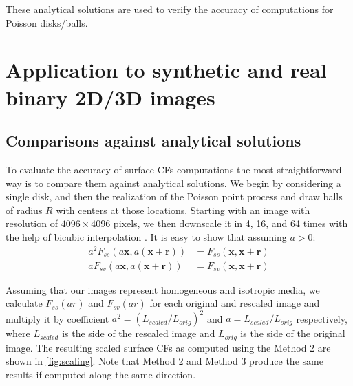 \documentclass[reprint,amsmath,amssymb,aps,pre]{revtex4-1}
\begin{document}
These analytical solutions are used to verify the accuracy of computations for
Poisson disks/balls.

\section{Application to synthetic and real binary 2D/3D images}
\label{sec:results}
\subsection{Comparisons against analytical solutions}
\label{sec:comparison}
To evaluate the accuracy of surface CFs computations the most straightforward
way is to compare them against analytical solutions. We begin by considering a
single disk, and then the realization of the Poisson point process and draw
balls of radius $R$ with centers at those locations. Starting with an image
with resolution of $4096 \times 4096$ pixels, we then downscale it in 4, 16, and
64 times with the help of bicubic interpolation \cite{mexicans}. It is easy to
show that assuming $a > 0$:
\begin{align}
  a^2 F_{ss}(a \mathbf{x}, a(\mathbf{x} + \mathbf{r})) &= F_{ss}(\mathbf{x},
  \mathbf{x} + \mathbf{r}) \label{eq:scale-ss} \\
  a F_{sv}(a \mathbf{x}, a(\mathbf{x} + \mathbf{r})) &= F_{sv}(\mathbf{x},
  \mathbf{x} + \mathbf{r}) \label{eq:scale-sv}
\end{align}

Assuming that our images represent homogeneous and isotropic media, we calculate
$F_{ss}(ar)$ and $F_{sv}(ar)$ for each original and rescaled image and multiply
it by coefficient $a^2 = (L_{scaled}/L_{orig})^2$ and $a = L_{scaled}/L_{orig}$
respectively, where $L_{scaled}$ is the side of the rescaled image and
$L_{orig}$ is the side of the original image. The resulting scaled surface CFs
as computed using the Method 2 are shown in \cref{fig:scaling}. Note that
Method 2 and Method 3 produce the same results if computed along the same
direction.
\end{document}
